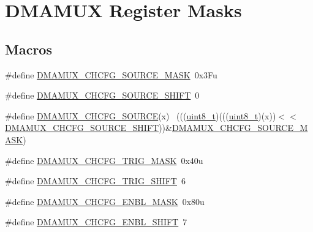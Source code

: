 \hypertarget{group___d_m_a_m_u_x___register___masks}{}\section{D\+M\+A\+M\+UX Register Masks}
\label{group___d_m_a_m_u_x___register___masks}
\subsection*{Macros}
\begin{DoxyCompactItemize}
\item 
\#define \hyperlink{group___d_m_a_m_u_x___register___masks_ga35b279ba0b1c9e817901494cdac305c5}{D\+M\+A\+M\+U\+X\+\_\+\+C\+H\+C\+F\+G\+\_\+\+S\+O\+U\+R\+C\+E\+\_\+\+M\+A\+SK}~0x3\+Fu
\item 
\#define \hyperlink{group___d_m_a_m_u_x___register___masks_gac2b7553c4599d8e919750598dd03f8a3}{D\+M\+A\+M\+U\+X\+\_\+\+C\+H\+C\+F\+G\+\_\+\+S\+O\+U\+R\+C\+E\+\_\+\+S\+H\+I\+FT}~0
\item 
\#define \hyperlink{group___d_m_a_m_u_x___register___masks_ga7e6dbf37a88078ee1e84987e92d737db}{D\+M\+A\+M\+U\+X\+\_\+\+C\+H\+C\+F\+G\+\_\+\+S\+O\+U\+R\+CE}(x)                                  ~(((\hyperlink{_p_e___types_8h_aba7bc1797add20fe3efdf37ced1182c5}{uint8\+\_\+t})(((\hyperlink{_p_e___types_8h_aba7bc1797add20fe3efdf37ced1182c5}{uint8\+\_\+t})(x))$<$$<$\hyperlink{group___d_m_a_m_u_x___register___masks_gac2b7553c4599d8e919750598dd03f8a3}{D\+M\+A\+M\+U\+X\+\_\+\+C\+H\+C\+F\+G\+\_\+\+S\+O\+U\+R\+C\+E\+\_\+\+S\+H\+I\+FT}))\&\hyperlink{group___d_m_a_m_u_x___register___masks_ga35b279ba0b1c9e817901494cdac305c5}{D\+M\+A\+M\+U\+X\+\_\+\+C\+H\+C\+F\+G\+\_\+\+S\+O\+U\+R\+C\+E\+\_\+\+M\+A\+SK})
\item 
\#define \hyperlink{group___d_m_a_m_u_x___register___masks_gafd2b6158f86bedffb640e73c40cdd0f5}{D\+M\+A\+M\+U\+X\+\_\+\+C\+H\+C\+F\+G\+\_\+\+T\+R\+I\+G\+\_\+\+M\+A\+SK}~0x40u
\item 
\#define \hyperlink{group___d_m_a_m_u_x___register___masks_ga714a6b142fde49d701e3f624bb2417e1}{D\+M\+A\+M\+U\+X\+\_\+\+C\+H\+C\+F\+G\+\_\+\+T\+R\+I\+G\+\_\+\+S\+H\+I\+FT}~6
\item 
\#define \hyperlink{group___d_m_a_m_u_x___register___masks_ga311ccb0a9a00f29da44f8c41b33ba79f}{D\+M\+A\+M\+U\+X\+\_\+\+C\+H\+C\+F\+G\+\_\+\+E\+N\+B\+L\+\_\+\+M\+A\+SK}~0x80u
\item 
\#define \hyperlink{group___d_m_a_m_u_x___register___masks_ga23d6f41370761b5c68e4d49f419aaee9}{D\+M\+A\+M\+U\+X\+\_\+\+C\+H\+C\+F\+G\+\_\+\+E\+N\+B\+L\+\_\+\+S\+H\+I\+FT}~7
$$
\end{DoxyCompactItemize}
